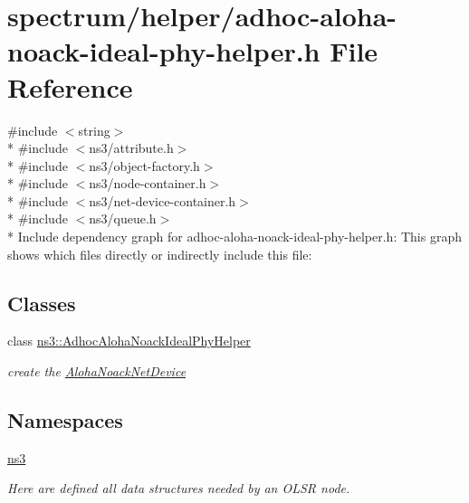 \hypertarget{adhoc-aloha-noack-ideal-phy-helper_8h}{}\section{spectrum/helper/adhoc-\/aloha-\/noack-\/ideal-\/phy-\/helper.h File Reference}
\label{adhoc-aloha-noack-ideal-phy-helper_8h}
{\ttfamily \#include $<$string$>$}\\*
{\ttfamily \#include $<$ns3/attribute.\+h$>$}\\*
{\ttfamily \#include $<$ns3/object-\/factory.\+h$>$}\\*
{\ttfamily \#include $<$ns3/node-\/container.\+h$>$}\\*
{\ttfamily \#include $<$ns3/net-\/device-\/container.\+h$>$}\\*
{\ttfamily \#include $<$ns3/queue.\+h$>$}\\*
Include dependency graph for adhoc-\/aloha-\/noack-\/ideal-\/phy-\/helper.h\+:
This graph shows which files directly or indirectly include this file\+:
\subsection*{Classes}
\begin{DoxyCompactItemize}
\item 
class \hyperlink{classns3_1_1AdhocAlohaNoackIdealPhyHelper}{ns3\+::\+Adhoc\+Aloha\+Noack\+Ideal\+Phy\+Helper}
\begin{DoxyCompactList}\small\item\em create the \hyperlink{classns3_1_1AlohaNoackNetDevice}{Aloha\+Noack\+Net\+Device} \end{DoxyCompactList}\end{DoxyCompactItemize}
\subsection*{Namespaces}
\begin{DoxyCompactItemize}
\item 
 \hyperlink{namespacens3}{ns3}
\begin{DoxyCompactList}\small\item\em Here are defined all data structures needed by an O\+L\+SR node. \end{DoxyCompactList}\end{DoxyCompactItemize}

